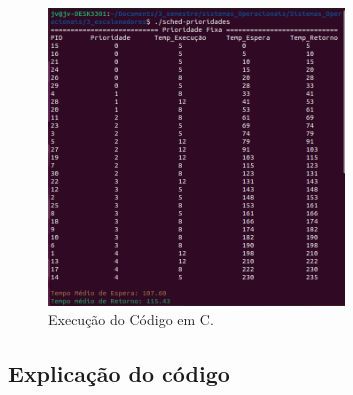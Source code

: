 \documentclass[
	12pt,				%
	openright,			%
	oneside,			%
	a4paper,			%
	chapter=TITLE,		%
	english,			%
	french,				%
	spanish,			%
	brazil				%
	]{abntex2}
\theoremstyle{definition}
\begin{document}
\begin{figure}[H]
    \centering
    \includegraphics[width=0.7\textwidth]{imagens/prioridades_run.png}
    \caption{Execução do Código em C.}
    \label{fig:prioridades_run}
\end{figure}

\subsection{Explicação do código}
\end{document}
